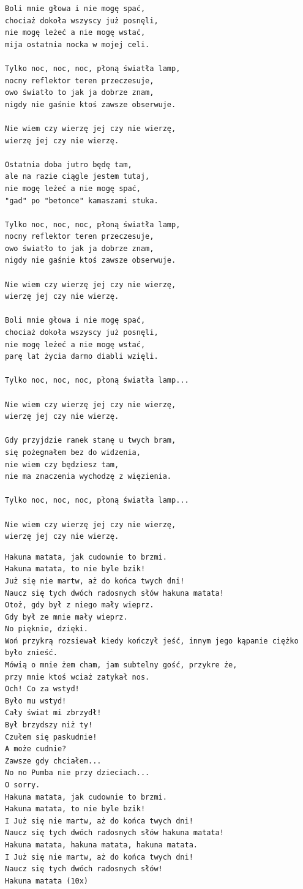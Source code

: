 \documentclass[12pt]{article}
\begin{document}
\begin{verbatim}
Boli mnie głowa i nie mogę spać,
chociaż dokoła wszyscy już posnęli,
nie mogę leżeć a nie mogę wstać,
mija ostatnia nocka w mojej celi.

Tylko noc, noc, noc, płoną światła lamp,
nocny reflektor teren przeczesuje,
owo światło to jak ja dobrze znam,
nigdy nie gaśnie ktoś zawsze obserwuje.

Nie wiem czy wierzę jej czy nie wierzę,
wierzę jej czy nie wierzę.

Ostatnia doba jutro będę tam,
ale na razie ciągle jestem tutaj,
nie mogę leżeć a nie mogę spać,
"gad" po "betonce" kamaszami stuka.

Tylko noc, noc, noc, płoną światła lamp,
nocny reflektor teren przeczesuje,
owo światło to jak ja dobrze znam,
nigdy nie gaśnie ktoś zawsze obserwuje.

Nie wiem czy wierzę jej czy nie wierzę,
wierzę jej czy nie wierzę.

Boli mnie głowa i nie mogę spać,
chociaż dokoła wszyscy już posnęli,
nie mogę leżeć a nie mogę wstać,
parę lat życia darmo diabli wzięli.

Tylko noc, noc, noc, płoną światła lamp...

Nie wiem czy wierzę jej czy nie wierzę,
wierzę jej czy nie wierzę.

Gdy przyjdzie ranek stanę u twych bram,
się pożegnałem bez do widzenia,
nie wiem czy będziesz tam,
nie ma znaczenia wychodzę z więzienia.

Tylko noc, noc, noc, płoną światła lamp...

Nie wiem czy wierzę jej czy nie wierzę,
wierzę jej czy nie wierzę.
\end{verbatim}
\clearpage

\begin{verbatim}
Hakuna matata, jak cudownie to brzmi.
Hakuna matata, to nie byle bzik!
Już się nie martw, aż do końca twych dni!
Naucz się tych dwóch radosnych słów hakuna matata!
Otoż, gdy był z niego mały wieprz.
Gdy był ze mnie mały wieprz.
No pięknie, dzięki.
Woń przykrą rozsiewał kiedy kończył jeść, innym jego kąpanie ciężko było znieść.
Mówią o mnie żem cham, jam subtelny gość, przykre że,
przy mnie ktoś wciaż zatykał nos.
Och! Co za wstyd!
Było mu wstyd!
Cały świat mi zbrzydł!
Był brzydszy niż ty!
Czułem się paskudnie!
A może cudnie?
Zawsze gdy chciałem...
No no Pumba nie przy dzieciach...
O sorry.
Hakuna matata, jak cudownie to brzmi.
Hakuna matata, to nie byle bzik!
I Już się nie martw, aż do końca twych dni!
Naucz się tych dwóch radosnych słów hakuna matata!
Hakuna matata, hakuna matata, hakuna matata.
I Już się nie martw, aż do końca twych dni!
Naucz się tych dwóch radosnych słów!
Hakuna matata (10x)
\end{verbatim}
\clearpage
\end{document}
